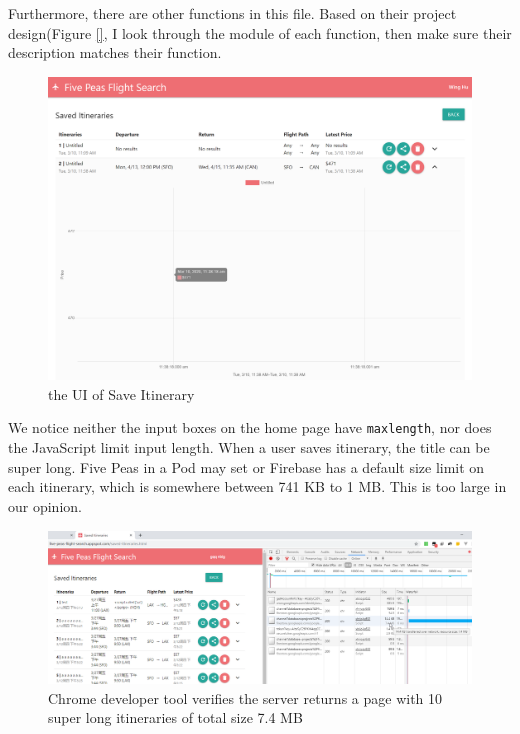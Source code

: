 \documentclass[12pt, a4paper]{article}
\newcommand{\code}[1]{\texttt{#1}}
\begin{document}
Furthermore, there are other functions in this file. Based on their project design(Figure \ref{}, I look through the module of each function, then make sure their description matches their function.

\begin{figure}[ht]
\centering
\includegraphics[width=\textwidth, frame]{save_itineraries2.png}
\caption{the UI of Save Itinerary}
\label{fig:save_itineraries2}
\end{figure}

We notice neither the input boxes on the home page have \code{maxlength}, nor does the JavaScript limit input length. When a user saves itinerary, the title can be super long. Five Peas in a Pod may set or Firebase has a default size limit on each itinerary, which is somewhere between 741 KB to 1 MB. This is too large in our opinion. 

\begin{figure}[ht]
\centering
\includegraphics[width=\textwidth]{response-size.png}
\caption{Chrome developer tool verifies the server returns a page with 10 super long itineraries of total size 7.4 MB}
\label{fig:response-size}
\end{figure}
\end{document}
